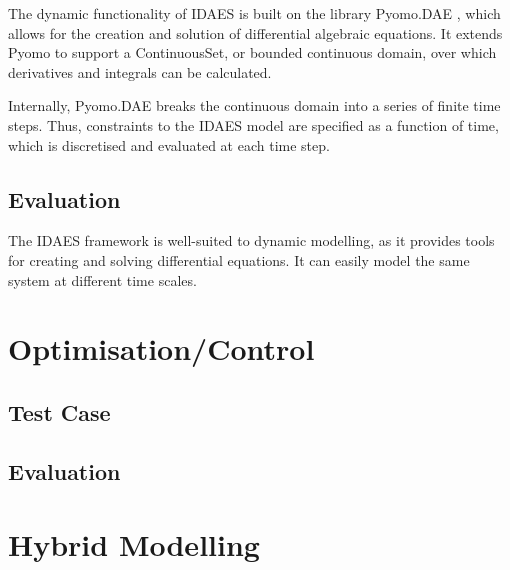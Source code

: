 \documentclass[12pt]{article}
\begin{document}

The dynamic functionality of IDAES is built on the library Pyomo.DAE \cite{nicholson2018pyomo}, which allows for the creation and solution of differential algebraic equations. It extends Pyomo to support a ContinuousSet, or bounded continuous domain, over which derivatives and integrals can be calculated. 

Internally, Pyomo.DAE breaks the continuous domain into a series of finite time steps. Thus, constraints to the IDAES model are specified as a function of time, which is discretised and evaluated at each time step.

\subsection{Evaluation}
The IDAES framework is well-suited to dynamic modelling, as it provides tools for creating and solving differential equations. It can easily model the same system at different time scales.





\section{Optimisation/Control}


\subsection{Test Case}





\subsection{Evaluation}


\section{Hybrid Modelling}
\end{document}
